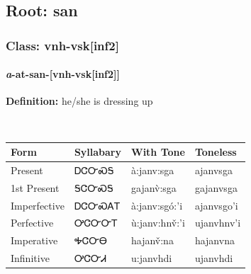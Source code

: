\needspace{4in}
\subsection*{Root: san}
\nopagebreak
{}
\needspace{3in}
\subsubsection*{Class: vnh-vsk[inf2]}
\nopagebreak
\needspace{2in}
\paragraph*{\textit{a}{-}at{-}\textbf{san}{-}[vnh-vsk[inf2]]}
\nopagebreak
\textbf{Definition: } he/she is dressing up
\\[0.5em]
\begin{tabularx}{\textwidth}{l X X X}%
\toprule%
\textbf{Form}&\textbf{Syllabary}&\textbf{With Tone}&\textbf{Toneless}\\%
\midrule%
Present&ᎠᏣᏅᏍᎦ&à:janv:sga&ajanvsga\\%
1st Present&ᎦᏣᏅᏍᎦ&gajanv̀:sga&gajanvsga\\%
Imperfective&ᎠᏣᏅᏍᎪᎢ&à:janv:sgó:’i&ajanvsgo’i\\%
Perfective&ᎤᏣᏅᏅᎢ&ù:janv:hnv̌:’i&ujanvhnv’i\\%
Imperative&ᎭᏣᏅᎾ&hajanv̌:na&hajanvna\\%
Infinitive&ᎤᏣᏅᏗ&u:janvhdi&ujanvhdi\\%
\bottomrule%
\end{tabularx}
\\[1em]